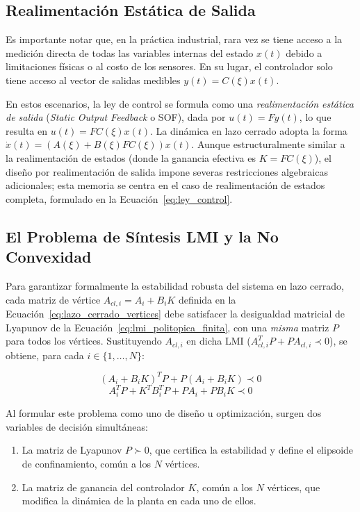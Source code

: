 \subsection{Realimentación Estática de Salida}
\label{subsec:realimentacion_salida}

Es importante notar que, en la práctica industrial, rara vez se tiene acceso a la medición directa de todas las variables internas del estado $x(t)$ debido a limitaciones físicas o al costo de los sensores. En su lugar, el controlador solo tiene acceso al vector de salidas medibles $y(t) = C(\xi) x(t)$.

En estos escenarios, la ley de control se formula como una \textit{realimentación estática de salida} (\textit{Static Output Feedback} o SOF), dada por $u(t) = F y(t)$, lo que resulta en $u(t) = F C(\xi) x(t)$. La dinámica en lazo cerrado adopta la forma $\dot{x}(t) = (A(\xi) + B(\xi)FC(\xi))x(t)$.
Aunque estructuralmente similar a la realimentación de estados (donde la ganancia efectiva es $K = FC(\xi)$), el diseño por realimentación de salida impone severas restricciones algebraicas adicionales; esta memoria se centra en el caso de realimentación de estados completa, formulado en la Ecuación~\eqref{eq:ley_control}.

\subsection{El Problema de Síntesis LMI y la No Convexidad}

Para garantizar formalmente la estabilidad robusta del sistema en lazo cerrado, cada matriz de vértice $A_{cl,i} = A_i + B_iK$ definida en la Ecuación~\eqref{eq:lazo_cerrado_vertices} debe satisfacer la desigualdad matricial de Lyapunov de la Ecuación~\eqref{eq:lmi_politopica_finita}, con una \emph{misma} matriz $P$ para todos los vértices. Sustituyendo $A_{cl,i}$ en dicha LMI ($A_{cl,i}^T P + P A_{cl,i} \prec 0$), se obtiene, para cada $i \in \{1, \dots, N\}$:

\begin{equation}
    (A_i + B_iK)^T P + P(A_i + B_iK) \prec 0
    \label{eq:bmi_vertice}
\end{equation}
\begin{equation}
    A_i^T P + K^T B_i^T P + P A_i + P B_iK \prec 0
    \label{eq:bmi_expandida}
\end{equation}

Al formular este problema como uno de diseño u optimización, surgen dos variables de decisión simultáneas: 
\begin{enumerate}
    \item La matriz de Lyapunov $P \succ 0$, que certifica la estabilidad y define el elipsoide de confinamiento, común a los $N$ vértices.
    \item La matriz de ganancia del controlador $K$, común a los $N$ vértices, que modifica la dinámica de la planta en cada uno de ellos.
\end{enumerate}

